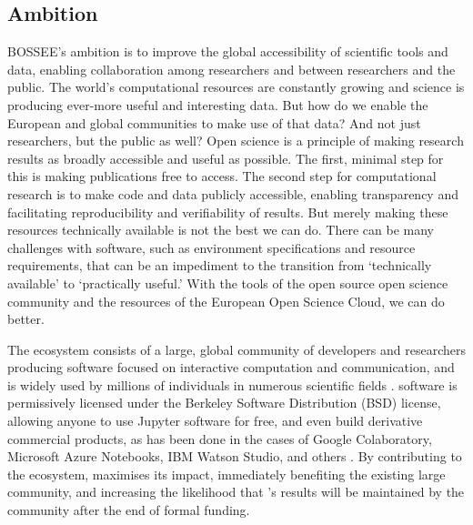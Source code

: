 
\subsection{Ambition}



BOSSEE's ambition is to improve the global accessibility of scientific tools and data,
enabling collaboration among researchers and between researchers and the public.
The world's computational resources are constantly growing and science is producing ever-more
useful and interesting data.
But how do we enable the European and global communities to make use of that data?
And not just researchers, but the public as well?
Open science is a principle of making research results as broadly accessible and useful as possible.
The first, minimal step for this is making publications free to access.
The second step for computational research is to make code and data publicly accessible,
enabling transparency and facilitating reproducibility and verifiability of results.
But merely making these resources technically available is not the best we can do.
There can be many challenges with software,
such as environment specifications and resource requirements,
that can be an impediment to the transition from `technically available' to `practically useful.'
With the tools of the open source open science community
and the resources of the European Open Science Cloud, we can do better.

The \Jupyter ecosystem consists of a large, global community of developers and researchers producing software
focused on interactive computation and communication,
and is widely used by millions of individuals in numerous scientific fields .
\Jupyter software is permissively licensed under the Berkeley Software Distribution (BSD)
license, allowing anyone to use Jupyter software for free,
and even build derivative commercial products,
as has been done in the cases of Google Colaboratory,
Microsoft Azure Notebooks,
IBM Watson Studio, and others .
By contributing to the \Jupyter ecosystem, \TheProject maximises its impact, immediately benefiting the existing large \Jupyter community,
and increasing the likelihood that \TheProject's results will be maintained by the community after the end of formal funding.

